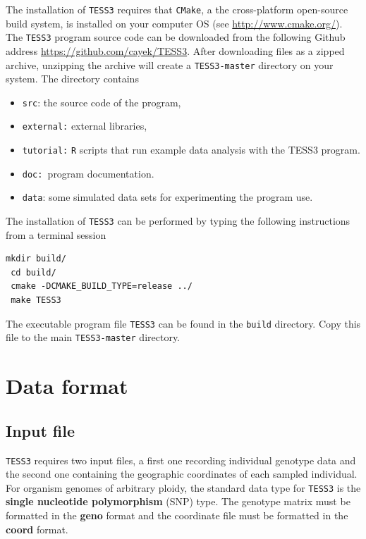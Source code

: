 \documentclass[10pt,a4paper]{article}
\begin{document}
The installation of {\tt TESS3} requires that {\tt CMake}, a the cross-platform open-source build system, is installed on your computer OS (see \url{ http://www.cmake.org/}).  The {\tt TESS3}  program source code can be downloaded from the following Github address \url{https://github.com/cayek/TESS3}. After downloading files as a zipped archive, unzipping the archive will create a {\tt TESS3-master} directory on your system. The  directory contains 
\begin{itemize}
\item   {\tt src}: the source code of the program,

\item   {\tt external:} external libraries,

\item   {\tt tutorial:} {\tt R} scripts that run example data analysis with the TESS3 program.

\item     {\tt doc: }program documentation.

\item     {\tt data}: some simulated data sets for experimenting the program use.
\end{itemize}
\noindent The installation of {\tt TESS3} can be performed by typing the following instructions from a terminal session 

\begin{Verbatim}[frame = single]
 mkdir build/
 cd build/
 cmake -DCMAKE_BUILD_TYPE=release ../
 make TESS3
\end{Verbatim}

 \noindent The executable program file {\tt TESS3} can be found in the {\tt build} directory. Copy this file to the main \verb|TESS3-master| directory.
  
\section{Data format}

\subsection{Input file}

{\tt TESS3} requires two input files, a first one recording individual genotype data and the second one containing the geographic coordinates of  each sampled individual. For organism genomes of arbitrary ploidy, the standard data type for {\tt TESS3} is the {\bf single nucleotide polymorphism} (SNP) type.  The genotype matrix must be formatted in the {\bf geno} format and the coordinate file must be formatted in the {\bf coord} format.
\end{document}
